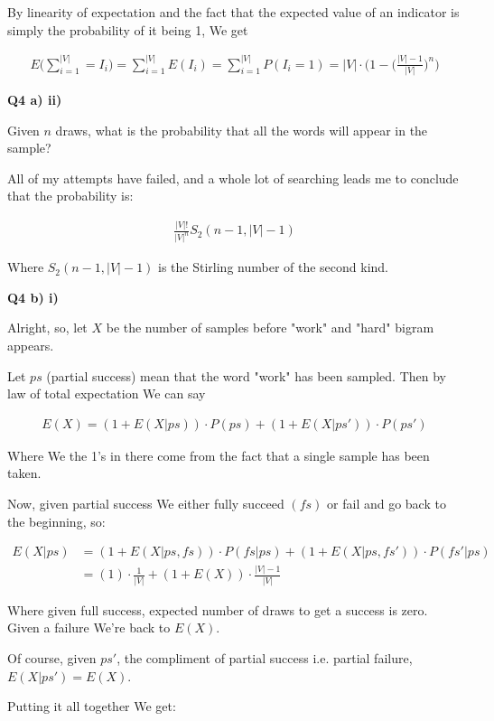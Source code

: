 \documentclass{article}
\begin{document}
	By linearity of expectation and the fact that the expected value of an indicator is simply the probability of it being 1, We get
	
	\begin{align}
		E\bigg(\sum^{|V|}_{i=1} = I_i \bigg) = \sum^{|V|}_{i=1} E(I_i) =  \sum^{|V|}_{i=1} P(I_i = 1) = |V|\cdot \bigg( 1 - \bigg(\frac{|V|-1}{|V|}\bigg)^n\bigg)
	\end{align}
	
\textbf{Q4 a) ii)}

	Given $n$ draws, what is the probability that all the words will appear in the sample? 
	
	All of my attempts have failed, and a whole lot of searching leads me to conclude that the probability is:
	
	\begin{align}
		\frac{|V|!}{|V|^n}S_2(n-1, |V|-1)
	\end{align}
	
	Where $S_2(n-1, |V|-1)$ is the Stirling number of the second kind. 
	
\textbf{Q4 b) i)}

	Alright, so, let $X$ be the number of samples before "work" and "hard" bigram appears.
	
	Let $ps$ (partial success) mean that the word "work" has been sampled. Then by law of total expectation We can say
	
	\begin{align}
		E(X) = (1+E(X|ps))\cdot P(ps) + (1+E(X|ps'))\cdot P(ps')
	\end{align}
	
	Where We the 1's in there come from the fact that a single sample has been taken.
	
	Now, given partial success We either fully succeed $(fs)$ or fail and go back to the beginning, so:
	
	\begin{align}
		E(X|ps) &= (1+E(X|ps, fs))\cdot P(fs|ps) + (1+E(X|ps, fs'))\cdot P(fs'|ps)\\
		&= (1)\cdot \frac{1}{|V|} + (1+E(X))\cdot \frac{|V|-1}{|V|}
	\end{align}
	
	Where given full success, expected number of draws to get a success is zero.  Given a failure We're back to $E(X)$.
	
	Of course, given $ps'$, the compliment of partial success i.e. partial failure, $E(X|ps') = E(X)$.
	
	Putting it all together We get:
	
\end{document}
